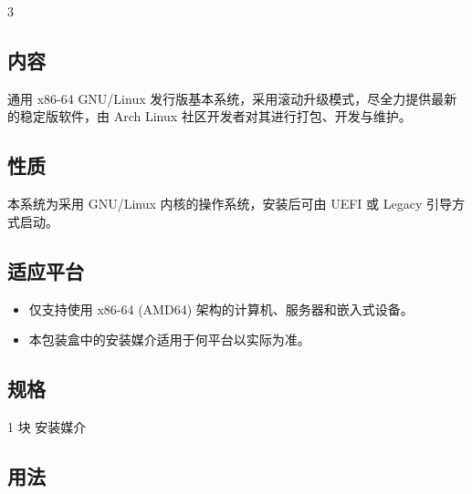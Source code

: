 \documentclass{article}
\begin{document}
\begin{multicols*}{3}
	\medskip


	\begin{tcolorbox}
	\section*{内容}
	\end{tcolorbox}

	通用 x86-64 GNU/Linux 发行版基本系统，采用滚动升级模式，尽全力提供最新的稳定版软件，由 Arch Linux 社区开发者对其进行打包、开发与维护。



	\medskip


	\begin{tcolorbox}
	\section*{性质}
	\end{tcolorbox}

	本系统为采用 GNU/Linux 内核的操作系统，安装后可由 UEFI 或 Legacy 引导方式启动。

	\medskip


	\begin{tcolorbox}
	\section*{适应平台}
	\end{tcolorbox}

	\begin{itemize}
		\item 仅支持使用 x86-64 (AMD64) 架构的计算机、服务器和嵌入式设备。
		\item 本包装盒中的安装媒介适用于何平台以实际为准。
	\end{itemize}


	\begin{tcolorbox}
	\section*{规格}
	\end{tcolorbox}

	1 块 安装媒介

	\medskip

	\begin{tcolorbox}
	\section*{用法}
	\end{tcolorbox}


\end{multicols*}
\end{document}
